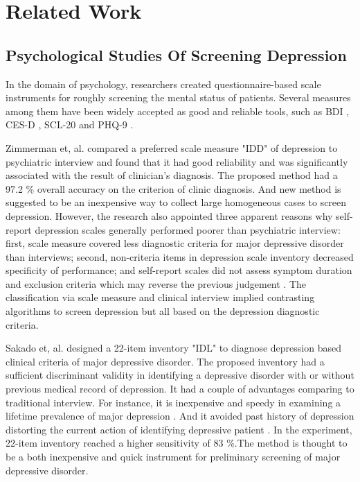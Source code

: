 \documentclass[10pt,journal,compsoc]{IEEEtran}
\begin{document}
%
%
%
%
\section{Related Work}
\subsection{Psychological Studies Of Screening Depression}
In the domain of psychology, researchers created questionnaire-based scale instruments for roughly screening the mental status of patients. Several measures among them have been widely accepted as good and reliable tools, such as BDI \cite{Huerta-Ramirez}\cite{Tsugawa}, CES-D \cite{DeChoudhury}\cite{Tsugawa}, SCL-20 and PHQ-9 \cite{Kroenke}. 

Zimmerman et, al. \cite{Zimmerman} compared a preferred scale measure "IDD" of depression to psychiatric interview and found that it had good reliability and was significantly associated with the result of clinician's diagnosis. The proposed method had a 97.2 \% \cite{Zimmerman} overall accuracy on the criterion of clinic diagnosis. And new method is suggested to be an inexpensive way to collect large homogeneous cases to screen depression. However, the research also appointed three apparent reasons why self-report depression scales generally performed poorer than psychiatric interview: first, scale measure covered less diagnostic criteria for major depressive disorder than interviews; second, non-criteria items in depression scale inventory decreased specificity of performance; and self-report scales did not assess symptom duration and exclusion criteria which may reverse the previous judgement \cite{Zimmerman}. The classification via scale measure and clinical interview implied contrasting algorithms \cite{Zimmerman} to screen depression but all based on the depression diagnostic criteria. 

Sakado et, al. \cite{Sakado} designed a 22-item inventory "IDL" to diagnose depression based clinical criteria of major depressive disorder. The proposed inventory had a sufficient discriminant validity in identifying a depressive disorder with or without previous medical record of depression. It had a couple of advantages comparing to traditional interview. For instance, it is inexpensive and speedy in examining a lifetime prevalence of major depression \cite{Sakado}. And it avoided past history of depression distorting the current action of identifying depressive patient \cite{Sakado}. In the experiment, 22-item inventory reached a higher sensitivity of 83 \%.The method is thought to be a both inexpensive and quick instrument for preliminary screening of major depressive disorder. 
\end{document}
